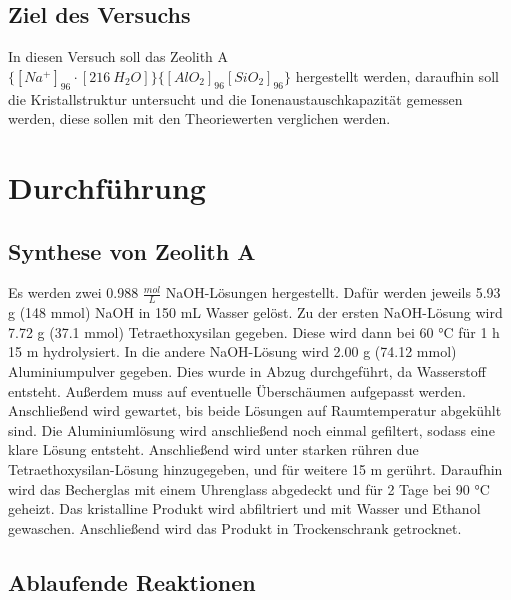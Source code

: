 \documentclass[12pt, a4paper]{article}
\begin{document}
\subsection{Ziel des Versuchs}
{
In diesen Versuch soll das Zeolith A $\{[{Na^+}]_{96}\cdotp[216 \: H_2O]\}\{[AlO_2]_{96}[SiO_2]_{96}\}$ hergestellt werden, daraufhin soll die Kristallstruktur untersucht und 
die Ionenaustauschkapazität gemessen werden, diese sollen mit den Theoriewerten verglichen werden.\cite{Skript}
}

\newpage
\section{Durchführung}
\subsection{Synthese von Zeolith A}
{
Es werden zwei 0.988 $\frac{mol}{L}$ NaOH-Lösungen hergestellt. Dafür werden jeweils 
5.93 g (148 mmol) NaOH in 150 mL Wasser gelöst. Zu der ersten NaOH-Lösung wird 7.72 g (37.1 mmol) {Tetraethoxysilan} gegeben. Diese wird 
dann bei 60 °C für 1 h 15 m hydrolysiert. In die andere NaOH-Lösung wird 2.00 g (74.12 mmol) Aluminiumpulver gegeben. Dies 
wurde in Abzug durchgeführt, da Wasserstoff entsteht. Außerdem muss auf eventuelle Überschäumen aufgepasst werden. Anschließend wird 
gewartet, bis beide Lösungen auf Raumtemperatur abgekühlt sind. Die Aluminiumlösung wird anschließend noch einmal gefiltert, sodass eine 
klare Lösung entsteht. Anschließend wird unter starken rühren due Tetraethoxysilan-Lösung hinzugegeben, und für weitere 15 m gerührt. 
Daraufhin wird das Becherglas mit einem Uhrenglass abgedeckt und für 2 Tage bei 90 °C geheizt. Das kristalline Produkt wird abfiltriert und 
mit Wasser und Ethanol gewaschen. Anschließend wird das Produkt in Trockenschrank getrocknet.
}

\subsection{Ablaufende Reaktionen}

\begin{center}
  






\end{center}
\end{document}

